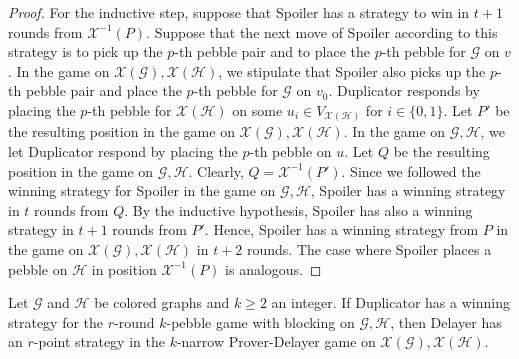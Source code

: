 \documentclass[a4paper,english, thm-restate]{lipics-v2021}
\newcommand{\graphG}{\mathcal{G}}
\newcommand{\graphH}{\mathcal{H}}
\newcommand{\graphXG}{\mathcal{X}(\mathcal{G})}
\newcommand{\graphXH}{\mathcal{X}(\mathcal{H})}
\newcommand{\vertexXH}{V_{\graphXH}}
\newcommand{\X}{\mathcal{X}}
\newcommand{\XI}{\X^{-1}}
\begin{document}
\begin{proof}
For the inductive step, suppose that Spoiler has a strategy to win in $t+1$ rounds from $\XI(P)$. Suppose that the next move of Spoiler according to this strategy is to pick up the $p$-th pebble pair and to place the $p$-th pebble for  $\graphG$ on $v$.
In the game on $\graphXG, \graphXH$, we stipulate that Spoiler also picks up the $p$-th pebble pair and place the $p$-th pebble for $\graphG$ on $v_0$. Duplicator responds by placing the $p$-th pebble for $\graphXH$ on some $u_i \in \vertexXH$ for $i \in \{0,1\}$.
Let $P'$ be the resulting position in the game on $\graphXG, \graphXH$.
In the game on $\graphG,\graphH$, we let Duplicator respond by
placing the $p$-th pebble on $u$. Let $Q$ be the resulting position in the game on  $\graphG,\graphH$.
Clearly, $Q = \XI(P')$.
Since we followed the winning strategy for Spoiler in the game on $\graphG,\graphH$,
Spoiler has a winning strategy in $t$ rounds from $Q$.
By the inductive hypothesis, Spoiler has also a winning strategy in $t+1$ rounds from $P'$.
Hence, Spoiler has a winning strategy from $P$ in the game on $\graphXG, \graphXH$ in $t+2$ rounds.
The case where Spoiler places a pebble on $\graphH$ in position $\XI(P)$ is analogous. 
\end{proof} 

\begin{lemma}
        Let $\graphG$ and $\graphH$ be colored graphs
        and $k\geq 2$ an integer. If Duplicator has a winning strategy for the $r$-round $k$-pebble game with blocking on $\graphG, \graphH$, then Delayer has an $r$-point strategy in the $k$-narrow Prover-Delayer game on $\graphXG, \graphXH$.
\end{lemma}
\end{document}
